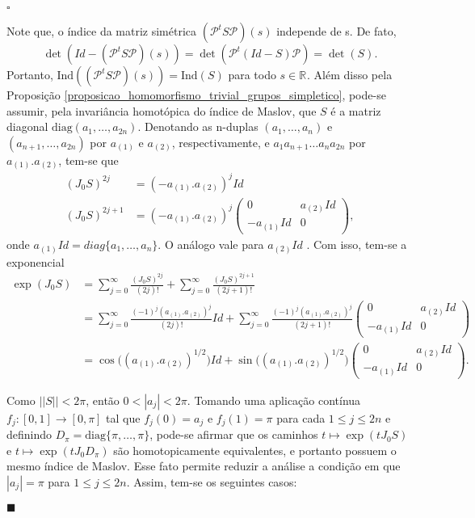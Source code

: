 \documentclass[12pt]{book}
\newenvironment{prova}[1]{$\square$ #1}{\hfill$\blacksquare$}
\newcommand{\diag}{\text{diag}}
\newcommand{\estruturacomplexa}{J_{0}}
\newcommand{\ind}{\text{Ind}}
\newcommand{\intervalo}{[0,1]}
\newcommand{\norma}[1]{||#1||}
\newcommand{\real}[1]{\mathbb{R}^{#1}}
\newcommand{\reta}{\real{}}
\begin{document}
\begin{prova}
\begin{enumerate}
			Note que, o índice da matriz simétrica $(\mathcal{P}^{t}S\mathcal{P})(s)$ independe de s. De fato, 
			$$
			\det(Id-(\mathcal{P}^{t}S\mathcal{P})(s)) = 			\det(\mathcal{P}^{t}(Id-S)\mathcal{P}) = \det(S).
			$$ 
			Portanto, $\ind((\mathcal{P}^{t}S\mathcal{P})(s)) = \ind(S)$ para todo $s \in \reta$. Além disso pela Proposição \ref{proposicao_homomorfismo_trivial_grupos_simpletico}, pode-se assumir, pela invariância homotópica do índice de Maslov, que $S$ é a matriz diagonal $\diag(a_{1},\dots,a_{2n})$. Denotando as n-duplas $(a_{1}, \dots, a_{n})$ e $(a_{n+1}, \dots, a_{2n})$ por $a_{(1)}$ e $a_{(2)}$, respectivamente, e $a_{1}a_{n+1}\dots a_{n}a_{2n}$ por $a_{(1)}.a_{(2)}$, tem-se que
			$$
			\begin{aligned}
			(\estruturacomplexa S)^{2j} &=(-a_{(1)}.a_{(2)})^{j} Id
			\\
			(\estruturacomplexa S)^{2j+1} 
			&= (-a_{(1)}.a_{(2)})^{j} 
			\left(
			\begin{array}{cc}
			0 & a_{(2)}Id
			\\
			-a_{(1)}Id & 0  
			\end{array}
			\right),
			\end{aligned}
			$$
			onde $a_{(1)}Id=diag\{a_{1}, \dots, a_{n}\}$. O análogo vale para $a_{(2)}Id$ . Com isso, tem-se a exponencial
			$$
			\begin{aligned}
			\exp(\estruturacomplexa S) &= \sum_{j=0}^{\infty}\frac{(\estruturacomplexa S)^{2j}}{(2j)!} + \sum_{j=0}^{\infty} \frac{(\estruturacomplexa S)^{2j+1}}{(2j+1)!}
			\\
			&= \sum_{j=0}^{\infty}\frac{(-1)^{j}(a_{(1)}.a_{(2)})^{j}}{(2j)!}Id + \sum_{j=0}^{\infty} \frac{(-1)^{j}(a_{(1)}.a_{(2)})^{j}}{(2j+1)!}	\left(
			\begin{array}{cc}
			0 & a_{(2)}Id
			\\
			-a_{(1)}Id & 0  
			\end{array}
			\right)
			\\
			&= \cos\big((a_{(1)}.a_{(2)})^{1/2}\big)Id +\sin\big((a_{(1)}.a_{(2)})^{1/2}\big)
			\left(
			\begin{array}{cc}
			0 & a_{(2)}Id
			\\
			-a_{(1)}Id & 0  
			\end{array}
			\right).
			\end{aligned}
			$$


			Como $\norma{S}<2\pi$, então $0<|a_{j}|<2\pi$. Tomando uma aplicação contínua $f_{j}:\intervalo \to [0,\pi]$ tal que $f_{j}(0) = a_{j}$ e $f_{j}(1) = \pi$ para cada $1\leq j \leq 2n$ e definindo $D_{\pi} = \diag\{\pi, \dots, \pi\}$, pode-se afirmar que os caminhos $t\mapsto \exp(t\estruturacomplexa S)$ e $t\mapsto \exp(t\estruturacomplexa D_{\pi})$ são homotopicamente equivalentes, e portanto possuem o mesmo índice de Maslov. Esse fato  permite reduzir a análise a condição em que $|a_{j}|=\pi$ para $1\leq j\leq 2n$. Assim, tem-se os seguintes casos:
			

\end{enumerate}
\end{prova}
\end{document}
